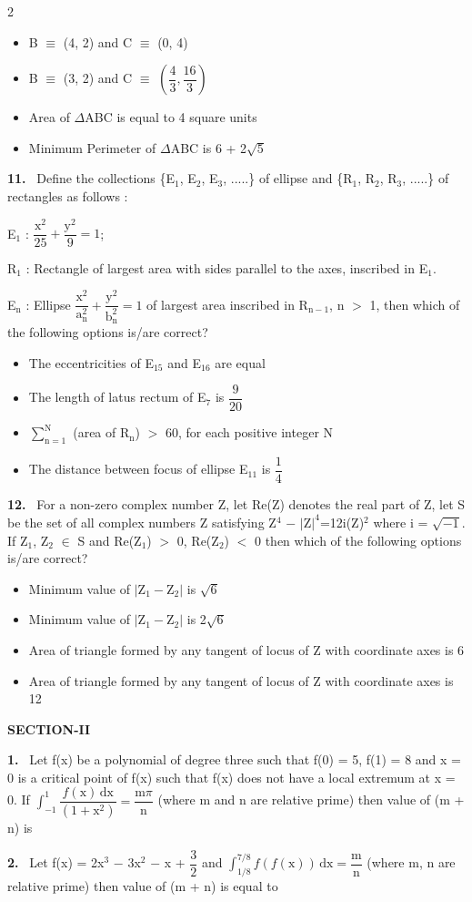 \documentclass[10pt]{extarticle}
\newcommand{\sect}[1]{\par\smallskip\noindent\textbf{#1}\par}
\newcommand{\qn}[1]{\par\smallskip\noindent\textbf{#1.}~}
\newenvironment{qoptions}{\begin{itemize}[leftmargin=1.8em,itemsep=1pt,topsep=2pt,label={}]}{\end{itemize}}
\newcommand{\opt}[2]{\item[(#1)] #2}
\begin{document}
\begin{multicols}{2}
\begin{qoptions}
\opt{A}{B $\equiv$ (4, 2) and C $\equiv$ (0, 4)}
\opt{B}{B $\equiv$ (3, 2) and C $\equiv$ $\left(\dfrac{4}{3},\dfrac{16}{3}\right)$}
\opt{C}{Area of $\Delta$ABC is equal to 4 square units}
\opt{D}{Minimum Perimeter of $\Delta$ABC is 6 + 2$\sqrt{5}$}
\end{qoptions}
\qn{11} Define the collections \{E$_1$, E$_2$, E$_3$, .....\} of ellipse and \{R$_1$, R$_2$, R$_3$, .....\} of rectangles as follows :\par
E$_1$ : $\dfrac{\text{x}^2}{25}+\dfrac{\text{y}^2}{9}=1$;\par
R$_1$ : Rectangle of largest area with sides parallel to the axes, inscribed in E$_1$.\par
E$_\text{n}$ : Ellipse $\dfrac{\text{x}^2}{\text{a}_\text{n}^2}+\dfrac{\text{y}^2}{\text{b}_\text{n}^2}=1$ of largest area inscribed in R$_{\text{n}-1}$, n $>$ 1, then which of the following options is/are correct?
\begin{qoptions}
\opt{A}{The eccentricities of E$_{15}$ and E$_{16}$ are equal}
\opt{B}{The length of latus rectum of E$_7$ is $\dfrac{9}{20}$}
\opt{C}{$\displaystyle\sum_{\text{n}=1}^{\text{N}}$ (area of R$_\text{n}$) $>$ 60, for each positive integer N}
\opt{D}{The distance between focus of ellipse E$_{11}$ is $\dfrac{1}{4}$}
\end{qoptions}
\qn{12} For a non-zero complex number Z, let Re(Z) denotes the real part of Z, let S be the set of all complex numbers Z satisfying Z$^4$ $-$ $|$Z$|^4$=12i(Z)$^2$ where i = $\sqrt{-1}$. If Z$_1$, Z$_2$ $\in$ S and Re(Z$_1$) $>$ 0, Re(Z$_2$) $<$ 0 then which of the following options is/are correct?
\begin{qoptions}
\opt{A}{Minimum value of $|\text{Z}_1-\text{Z}_2|$ is $\sqrt{6}$}
\opt{B}{Minimum value of $|\text{Z}_1-\text{Z}_2|$ is 2$\sqrt{6}$}
\opt{C}{Area of triangle formed by any tangent of locus of Z with coordinate axes is 6}
\opt{D}{Area of triangle formed by any tangent of locus of Z with coordinate axes is 12}
\end{qoptions}
\sect{SECTION-II}
\qn{1} Let f(x) be a polynomial of degree three such that f(0) = 5, f(1) = 8 and x = 0 is a critical point of f(x) such that f(x) does not have a local extremum at x = 0. If $\displaystyle\int_{-1}^{1}\dfrac{f(\text{x})\,\text{dx}}{(1+\text{x}^2)}=\dfrac{\text{m}\pi}{\text{n}}$ (where m and n are relative prime) then value of (m + n) is
\qn{2} Let f(x) = 2x$^3$ $-$ 3x$^2$ $-$ x + $\dfrac{3}{2}$ and $\displaystyle\int_{1/8}^{7/8} f(f(\text{x}))\,\text{dx}=\dfrac{\text{m}}{\text{n}}$ (where m, n are relative prime) then value of (m + n) is equal to

\end{multicols}
\end{document}
